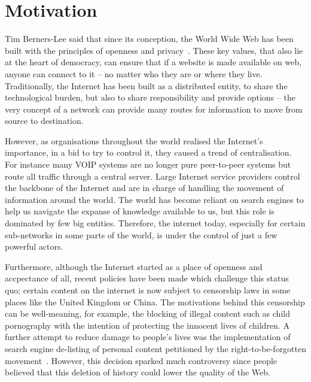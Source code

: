 \documentclass[ %
                    author={Samuel Russell},
                supervisor={Prof. Bogdan Warinschi},
                    degree={MEng},
                     title={Innocuous Ciphertexts},
                  subtitle={The DE-CENSOR Scheme},
                      type={Research},
                      year={2018} ]{dissertation}
\begin{document}

\chapter{Motivation}
\label{chap:context}

Tim Berners-Lee said that since its conception, the World Wide Web has been built with the principles of openness and privacy~\cite{gard}.
These key values, that also lie at the heart of democracy, can ensure that if a website is made available on web, anyone can connect to it -- no matter who they are or where they live.
Traditionally, the Internet has been built as a distributed entity, to share the technological burden, but also to share responsibility and provide options -- the very concept of a network can provide many routes for information to move from source to destination.

However, as organisations throughout the world realised the Internet's importance, in a bid to try to control it, they caused a trend of centralisation.
For instance many VOIP systems are no longer pure peer-to-peer systems but route all traffic through a central server.
Large Internet service providers control the backbone of the Internet and are in charge of handling the movement of information around the world.
The world has become reliant on search engines to help us navigate the expanse of knowledge available to us, but this role is dominated by few big entities.
Therefore, the internet today, especially for certain sub-networks in some parts of the world, is under the control of just a few powerful actors.

Furthermore, although the Internet started as a place of openness and accpectance of all, recent policies have been made which challenge this status quo; certain content on the internet is now subject to censorship laws in some places like the United Kingdom or China. The motivations behind this censorship can be well-meaning, for example, the blocking of illegal content such as child pornography with the intention of protecting the innocent lives of children. A further attempt to reduce damage to people's lives was the implementation of search engine de-listing of personal content petitioned by the right-to-be-forgotten movement~\cite{rtbf}. However, this decision sparked much controversy since people believed that this deletion of history could lower the quality of the Web.
\end{document}
